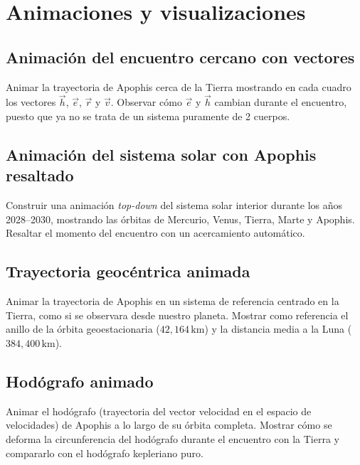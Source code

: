\section{Animaciones y visualizaciones}

\subsection{Animación del encuentro cercano con vectores}

Animar la trayectoria de Apophis cerca de la Tierra mostrando en cada cuadro los vectores $\vec{h}$, $\vec{e}$, $\vec{r}$ y $\vec{v}$. Observar cómo $\vec{e}$ y $\vec{h}$ cambian durante el encuentro, puesto que ya no se trata de un sistema puramente de 2 cuerpos.

\subsection{Animación del sistema solar con Apophis resaltado}

Construir una animación \textit{top-down} del sistema solar interior durante los años 2028--2030, mostrando las órbitas de Mercurio, Venus, Tierra, Marte y Apophis. Resaltar el momento del encuentro con un acercamiento automático.

\subsection{Trayectoria geocéntrica animada}

Animar la trayectoria de Apophis en un sistema de referencia centrado en la Tierra, como si se observara desde nuestro planeta. Mostrar como referencia el anillo de la órbita geoestacionaria ($42{,}164\,\mathrm{km}$) y la distancia media a la Luna ($384{,}400\,\mathrm{km}$).

\subsection{Hodógrafo animado}

Animar el hodógrafo (trayectoria del vector velocidad en el espacio de velocidades) de Apophis a lo largo de su órbita completa. Mostrar cómo se deforma la circunferencia del hodógrafo durante el encuentro con la Tierra y compararlo con el hodógrafo kepleriano puro.